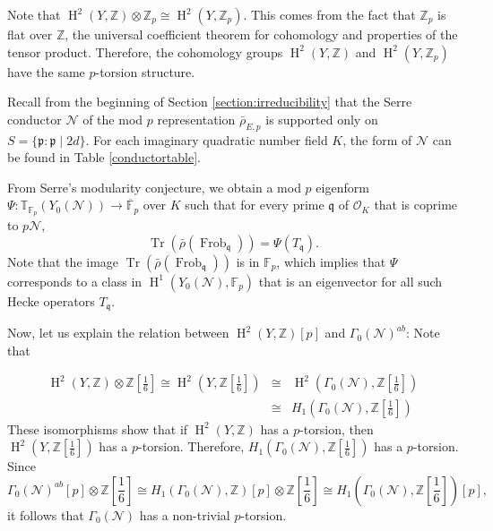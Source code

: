 \documentclass[]{article}
\newcommand {\ZZ}{{\mathbb{Z}}}
\newcommand {\mcalO}{{\mathcal{O}}}
\begin{document}
Note that $\operatorname{H}^2(Y,\ZZ)\otimes \ZZ_p \cong \operatorname{H}^2(Y, \ZZ_p)$. This comes from the fact that  $\ZZ_p$ is flat over $\ZZ$, the universal coefficient theorem for cohomology and properties of the tensor product. Therefore, the cohomology groups $\operatorname{H}^2(Y,\ZZ)$ and $\operatorname{H}^2(Y,\ZZ_p)$ have the same $p$-torsion structure.

Recall from the beginning of Section \ref{section:irreducibility} that the Serre conductor $\mathcal{N}$ of the mod $p$ representation $\bar{\rho}_{E, p}$ is supported only on $S=\{\mathfrak{p}:\mathfrak{p}\mid2d\}$. For each imaginary quadratic number field $K$, the form of $\mathcal{N}$ can be found in Table \ref{conductortable}.

From Serre's modularity conjecture, we obtain a mod $p$ eigenform $\Psi: \mathbb{T}_{\mathbb{F}_p}\left(Y_0(\mathcal{N})\right) \rightarrow \overline{\mathbb{F}}_p$ over $K$ such that for every prime $\mathfrak{q}$ of $\mcalO_K$ that is coprime to $p\mathcal{N}$, $$
\operatorname{Tr}\left(\bar{\rho}\left(\operatorname{Frob}_{\mathfrak{q}}\right)\right)=\Psi\left(T_{\mathfrak{q}}\right) .
$$
Note that the image $\operatorname{Tr}\left(\bar{\rho}\left(\operatorname{Frob}_{\mathfrak{q}}\right)\right)$ is in $\mathbb{F}_p$, which implies that $\Psi$ corresponds to a class in $\operatorname{H}^1\left(Y_0(\mathcal{N}), \mathbb{F}_p\right)$ that is an eigenvector for all such Hecke operators $T_{\mathfrak{q}}$. 

Now, let us explain the relation between $\operatorname{H}^2(Y,\ZZ)[p]$ and $\Gamma_0(\mathcal{N})^{ab}$: Note that

\begin{eqnarray*}
    \operatorname{H}^2(Y,\ZZ)\otimes \mathbb{Z}\left[\frac{1}{6}\right] \cong \operatorname{H}^2\left(Y, \mathbb{Z}\left[\frac{1}{6}\right]\right) &\cong& \operatorname{H}^2\left(\Gamma_0(\mathcal{N}),\mathbb{Z}\left[\frac{1}{6}\right]\right)\\
    &\cong& H_1\left(\Gamma_0(\mathcal{N}),\mathbb{Z}\left[\frac{1}{6}\right]\right)
\end{eqnarray*}These isomorphisms show that if $\operatorname{H}^2(Y,\ZZ)$ has a $p$-torsion, then $\operatorname{H}^2\left(Y, \mathbb{Z}\left[\frac{1}{6}\right]\right)$ has a $p$-torsion. Therefore, $H_1\left(\Gamma_0(\mathcal{N}),\mathbb{Z}\left[\frac{1}{6}\right]\right)$ has a $p$-torsion. Since $$\Gamma_0(\mathcal{N})^{ab}[p]\otimes\mathbb{Z}\left[\frac{1}{6}\right]\cong H_1(\Gamma_0(\mathcal{N}),\ZZ)[p]\otimes\mathbb{Z}\left[\frac{1}{6}\right]\cong H_1\left(\Gamma_0(\mathcal{N}), \mathbb{Z}\left[\frac{1}{6}\right]\right)[p],$$ it follows that $\Gamma_0(\mathcal{N})$ has a non-trivial $p$-torsion.
\end{document}
